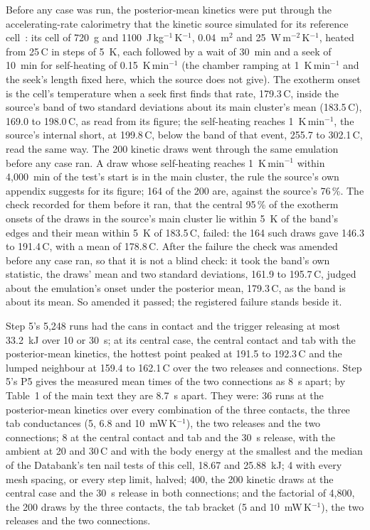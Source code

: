 \documentclass[preprint,12pt]{elsarticle}
\newcommand{\degC}{\,\textdegree C}
\begin{document}
Before any case was run, the posterior-mean kinetics were put through the accelerating-rate calorimetry that the kinetic source simulated for its reference cell~\cite{koenig2025uncertainty}: its cell of 720~g and 1100~J\,kg$^{-1}$\,K$^{-1}$, 0.04~m$^2$ and 25~W\,m$^{-2}$\,K$^{-1}$, heated from 25\degC{} in steps of 5~K, each followed by a wait of 30~min and a seek of 10~min for self-heating of 0.15~K\,min$^{-1}$ (the chamber ramping at 1~K\,min$^{-1}$ and the seek's length fixed here, which the source does not give). The exotherm onset is the cell's temperature when a seek first finds that rate, 179.3\degC, inside the source's band of two standard deviations about its main cluster's mean (183.5\degC), 169.0 to 198.0\degC, as read from its figure; the self-heating reaches 1~K\,min$^{-1}$, the source's internal short, at 199.8\degC, below the band of that event, 255.7 to 302.1\degC, read the same way. The 200 kinetic draws went through the same emulation before any case ran. A draw whose self-heating reaches 1~K\,min$^{-1}$ within 4,000~min of the test's start is in the main cluster, the rule the source's own appendix suggests for its figure; 164 of the 200 are, against the source's 76\,\%. The check recorded for them before it ran, that the central 95\,\% of the exotherm onsets of the draws in the source's main cluster lie within 5~K of the band's edges and their mean within 5~K of 183.5\degC, failed: the 164 such draws gave 146.3 to 191.4\degC, with a mean of 178.8\degC. After the failure the check was amended before any case ran, so that it is not a blind check: it took the band's own statistic, the draws' mean and two standard deviations, 161.9 to 195.7\degC, judged about the emulation's onset under the posterior mean, 179.3\degC, as the band is about its mean. So amended it passed; the registered failure stands beside it.

Step 5's 5,248 runs had the cans in contact and the trigger releasing at most 33.2~kJ over 10 or 30~s; at its central case, the central contact and tab with the posterior-mean kinetics, the hottest point peaked at 191.5 to 192.3\degC{} and the lumped neighbour at 159.4 to 162.1\degC{} over the two releases and connections. Step 5's P5 gives the measured mean times of the two connections as 8~s apart; by Table~1 of the main text they are 8.7~s apart. They were: 36 runs at the posterior-mean kinetics over every combination of the three contacts, the three tab conductances (5, 6.8 and 10~mW\,K$^{-1}$), the two releases and the two connections; 8 at the central contact and tab and the 30~s release, with the ambient at 20 and 30\degC{} and with the body energy at the smallest and the median of the Databank's ten nail tests of this cell, 18.67 and 25.88~kJ; 4 with every mesh spacing, or every step limit, halved; 400, the 200 kinetic draws at the central case and the 30~s release in both connections; and the factorial of 4,800, the 200 draws by the three contacts, the tab bracket (5 and 10~mW\,K$^{-1}$), the two releases and the two connections.
\end{document}
